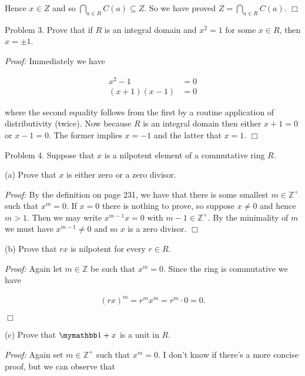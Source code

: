 \documentclass{article}
\begin{document}
  Hence $x\in Z$ and so $\displaystyle \bigcap_{a\in R} C(a) \subseteq Z.$  So we have proved $\displaystyle Z = \bigcap_{a\in R} C(a)$. $\Box$



  \pagebreak

  {\Large \color{Sepia} Problem 3.  Prove that if $R$ is an integral domain and $x^2= 1$ for some $x\in R$, then $x=\pm1$.}

  {\it Proof:} Immediately we have

  \begin{align*}
    x^2 - 1 &= 0\\
    (x+1)(x-1) &= 0
  \end{align*}

  where the second equality follows from the first by a routine application of distributivity (twice).  Now because $R$ is an integral domain then either $x+1=0$ or $x-1=0$.  The former implies $x=-1$ and the latter that $x=1$.  $\Box$

  \pagebreak

  {\Large \color{Sepia} Problem 4.  Suppose that $x$ is a nilpotent element of a commutative ring $R$.

  (a)  Prove that $x$ is either zero or a zero divisor.}

  {\it Proof:} By the definition on page 231, we have that there is some smallest $m\in \mathbb Z^+$ such that $x^m = 0$.  If $x=0$ there is nothing to prove, so suppose $x\ne 0$ and hence $m>1$.  Then we may write $x^{m-1}x = 0$ with $m-1\in\mathbb Z^+$.  By the minimality of $m$ we must have $x^{m-1}\ne 0$ and so $x$ is a zero divisor.  $\Box$

  \vspace{1cm}

  {\Large \color{Sepia} (b)  Prove that $rx$ is nilpotent for every $r\in R$.}

  {\it Proof:} Again let $m\in \mathbb Z$ be such that $x^m=0$.  Since the ring is commutative we have

  \begin{align*}
    (rx)^m = r^m x^m = r^m \cdot 0 = 0.
  \end{align*}

  $\Box$

  \vspace{1cm}

  {\Large \color{Sepia} (c)  Prove that $\mymathbb 1 +x$ is a unit in $R$.}

  {\it Proof:} Again set $m\in\mathbb Z^+$ such that $x^m = 0$.  I don't know if there's a more concise proof, but we can observe that
\end{document}
